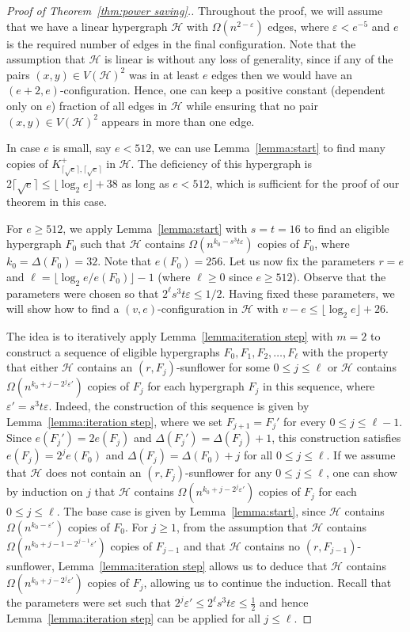 \documentclass[11pt]{article}
\numberwithin{equation}{section}
\def\eps{\varepsilon}
\def\cH{\mathcal{H}}
\theoremstyle{plain}
\theoremstyle{remark}
\begin{document}
\begin{proof}[Proof of Theorem~\ref{thm:power saving}.]
Throughout the proof, we will assume that we have a linear hypergraph $\cH$ with $\Omega(n^{2-\eps})$ edges, where $\eps<e^{-5}$ and $e$ is the required number of edges in the final configuration. Note that the assumption that $\cH$ is linear is without any loss of generality, since if any of the pairs $(x, y)\in V(\cH)^2$ was in at least $e$ edges then we would have an $(e+2, e)$-configuration. Hence, one can keep a positive constant (dependent only on $e$) fraction of all edges in $\cH$ while ensuring that no pair $(x, y)\in V(\cH)^2$ appears in more than one edge.

In case $e$ is small, say $e<512$, we can use Lemma~\ref{lemma:start} to find many copies of $K_{\lceil \sqrt{e}\rceil, \lceil \sqrt{e}\rceil}^{+}$ in $\cH$. The deficiency of this hypergraph is $2\lceil\sqrt{e}\rceil\leq \lfloor \log_2 e\rfloor +38$ as long as $e<512$, which is sufficient for the proof of our theorem in this case.

For $e\geq 512$, we apply Lemma~\ref{lemma:start} with $s=t=16$ to find an eligible hypergraph $F_0$ such that $\cH$ contains $\Omega(n^{k_0-s^3 t \eps})$ copies of $F_0$, where $k_0=\Delta(F_0) = 32$. Note that $e(F_0) = 256$. Let us now fix the parameters $r=e$ and $\ell=\lfloor \log_2 e/e(F_0)\rfloor-1$ (where $\ell\geq 0$ since $e\geq 512$). Observe that the parameters were chosen so that $2^\ell s^3t \eps\leq 1/2$. Having fixed these parameters, we will show how to find a $(v, e)$-configuration in $\cH$ with $v-e\leq \lfloor \log_2 e\rfloor +26$.

The idea is to iteratively apply Lemma~\ref{lemma:iteration step} with $m=2$ to construct a sequence of eligible hypergraphs $F_0, F_1, F_2, \dots, F_\ell$ with the property that either $\cH$ contains an $(r, F_j)$-sunflower for some $0\leq j\leq \ell$ or $\cH$ contains $\Omega(n^{k_0+j-2^j \eps'})$ copies of $F_j$ for each hypergraph $F_j$ in this sequence, where $\eps'=s^3t\eps$. Indeed, the construction of this sequence is given by Lemma~\ref{lemma:iteration step}, where we set $F_{j+1}=F_j'$ for every $0 \le j \le \ell-1$. Since $e(F_j')=2e(F_j)$ and $\Delta(F_j')=\Delta(F_j)+1$, this construction satisfies $e(F_j)=2^je(F_0)$ and $\Delta(F_j)=\Delta(F_0)+j$ for all $0 \le j \le \ell$.
If we assume that $\cH$ does not contain an $(r, F_j)$-sunflower for any $0\leq j\leq \ell$, one can show by induction on $j$ that $\cH$ contains $\Omega(n^{k_0+j-2^j \eps'})$ copies of $F_j$ for each $0\leq j\leq \ell$. The base case is given by Lemma~\ref{lemma:start}, since $\cH$ contains $\Omega(n^{k_0-\eps'})$ copies of $F_0$. For $j\ge 1$, from the assumption that $\cH$ contains $\Omega(n^{k_0+j-1-2^{j-1}\eps'})$ copies of $F_{j-1}$ and that $\cH$ contains no $(r, F_{j-1})$-sunflower, Lemma~\ref{lemma:iteration step} allows us to deduce that $\cH$ contains $\Omega(n^{k_0+j-2^j \eps'})$ copies of $F_j$, allowing us to continue the induction. Recall that the parameters were set such that $2^j \eps'\leq 2^\ell s^3 t\eps \leq \frac{1}{2}$ and hence Lemma~\ref{lemma:iteration step} can be applied for all $j\leq \ell$.


\end{proof}
\end{document}
